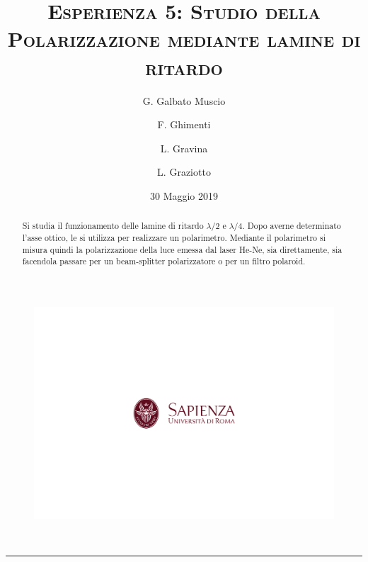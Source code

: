 \documentclass[10pt,oneside,a4paper]{article}
\title{\textsc{\textbf{Esperienza 5}: Studio della Polarizzazione mediante lamine di ritardo}}
\author{\small{G. Galbato Muscio} \and \small{F. Ghimenti} \and \small{L. Gravina} \and \small{L. Graziotto}}
\date{30 Maggio 2019}
\begin{document}
	\begin{figure}
		\centering
		\includegraphics[scale=0.5, trim={2.8cm 8.9cm 0 9cm}, clip]{logo.png}
	\end{figure}
	\maketitle
	\begin{center} 
		 \\
	\end{center}
\hrule
\vfill
\renewcommand{\abstractname}{Abstract}
\begin{abstract}
Si studia il funzionamento delle lamine di ritardo $\lambda / 2$ e $\lambda / 4$. Dopo averne determinato l'asse ottico, le si utilizza per realizzare un polarimetro. Mediante il polarimetro si misura quindi la polarizzazione della luce emessa dal laser He-Ne, sia direttamente, sia facendola passare per un beam-splitter polarizzatore o per un filtro polaroid.
\end{abstract}
\vfill
\tableofcontents %
\newpage


\pagebreak
\end{document}
